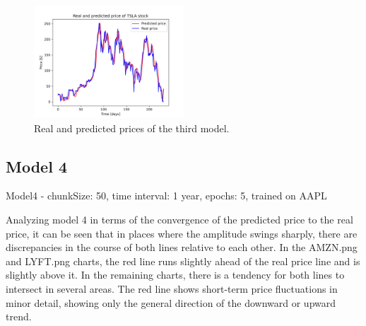 \begin{figure}
\includegraphics[width=0.5\textwidth]{./graf/model3/TSLA.png}
\caption{Real and predicted prices of the third model.}
\label{fig:label}
\end{figure} 

\clearpage
\subsection{Model 4}

Model4 - chunkSize: 50, time interval: 1 year, epochs: 5, trained on AAPL\par\bigskip
Analyzing model 4 in terms of the convergence of the predicted price to the real price, it can be seen that in places where the amplitude swings sharply, there are discrepancies in the course of
both lines relative to each other. In the AMZN.png and LYFT.png charts, the red line runs slightly
ahead of the real price line and is slightly above it. In the remaining charts, there is a tendency for
both lines to intersect in several areas. The red line shows short-term price fluctuations in minor
detail, showing only the general direction of the downward or upward trend.

